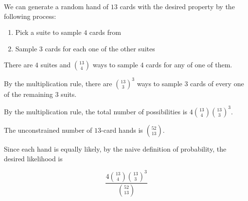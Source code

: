 We can generate a random hand of $13$ cards with the desired property by the following process:

\begin{enumerate}
  \item Pick a suite to sample $4$ cards from

  \item Sample $3$ cards for each one of the other suites
\end{enumerate}

There are $4$ suites and $\binom{13}{4}$ ways to sample $4$ cards for any of one of them. 

By the multiplication rule, there are $\binom{13}{3}^{3}$ ways to sample $3$ cards of every one of the remaining $3$ suits. 

By the multiplication rule, the total number of possibilities is $4 \binom{13}{4} \binom{13}{3}^{3}.$

The unconstrained number of $13$-card hands is $\binom{52}{13}$. 

Since each hand is equally likely, by the naive definition of probability, the desired likelihood is

$$ \frac{4 \binom{13}{4} \binom{13}{3}^{3}}{\binom{52}{13}} $$